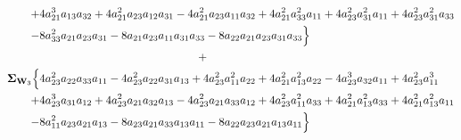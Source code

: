 \documentclass{article}
\begin{document}
\begin{equation}
\begin{aligned}
+&4 a_{21}^{3} a_{13} a_{32} + 4 a_{21}^{2} a_{23} a_{12} a_{31} - 4 a_{21}^{2} a_{23} a_{11} a_{32} + 4 a_{21}^{2} a_{33}^{2} a_{11} + 4 a_{23}^{2} a_{31}^{2} a_{11} + 4 a_{23}^{2} a_{31}^{2} a_{33} \\
-&8 a_{33}^{2} a_{21} a_{23} a_{31} - 8 a_{21} a_{23} a_{11} a_{31} a_{33} - 8 a_{22} a_{21} a_{23} a_{31} a_{33}\Bigr\} \\
& \qquad \qquad \qquad \qquad \qquad \qquad \qquad + \\
\mathbf{\Sigma}_{\textbf{W}_{3}} \Bigl\{&4 a_{23}^{2} a_{22} a_{33} a_{11} - 4 a_{23}^{2} a_{22} a_{31} a_{13} + 4 a_{23}^{2} a_{11}^{2} a_{22} +4 a_{21}^{2} a_{13}^{2} a_{22} - 4 a_{23}^{3} a_{32} a_{11} + 4 a_{23}^{2} a_{11}^{3} \\
+&4 a_{23}^{3} a_{31} a_{12} + 4 a_{23}^{2} a_{21} a_{32} a_{13} - 4 a_{23}^{2} a_{21} a_{33} a_{12} + 4 a_{23}^{2} a_{11}^{2} a_{33} + 4 a_{21}^{2} a_{13}^{2} a_{33} + 4 a_{21}^{2} a_{13}^{2} a_{11} \\
-&8 a_{11}^{2} a_{23} a_{21} a_{13} - 8 a_{23} a_{21} a_{33} a_{13} a_{11} - 8 a_{22} a_{23} a_{21} a_{13} a_{11}\Bigr\}
\end{aligned}
\label{eq:network3by3_sigma22}
\end{equation}
\end{document}
